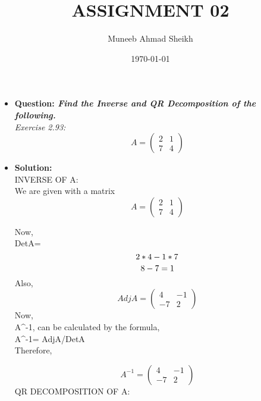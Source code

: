 \documentclass{article}
\begin{document}
\title{ASSIGNMENT 02 }
\author{Muneeb Ahmad Sheikh}
\date{\today}
\maketitle

\begin{itemize}
\item{\textbf{Question:{\textit{ Find the Inverse and QR Decomposition of the\\ following.}}}}\\

\newpage
{\textit{Exercise 2.93:}}
\[
A=
\begin{pmatrix}
2 & 1\\
7 & 4
\end{pmatrix}
\]

\item{\textbf{Solution:}}\\

INVERSE OF A:\\

We are given with a matrix 
\[
A=
\begin{pmatrix}
2 & 1\\
7 & 4
\end{pmatrix}
\]

Now,\\

DetA=
 $$
 2*4 - 1*7\\
 $$
 $$
 8 - 7=1\\
$$
Also,\\

\[
AdjA=
\begin{pmatrix}
4 & -1\\
-7 & 2
\end{pmatrix}
\]
Now,\\

A^{-1}, can \hspace{0.3 cm}be \hspace{0.3 cm}calculated \hspace{0.3 cm}by \hspace{0.3 cm}the \hspace{0.3 cm}formula,\\

A^{-1}= AdjA/DetA\\

Therefore, 

\[
A^{-1}=
\begin{pmatrix}
4 & -1\\
-7 & 2
\end{pmatrix}
\]
\newpage
QR DECOMPOSITION OF A:\\


\end{itemize}
\end{document}
